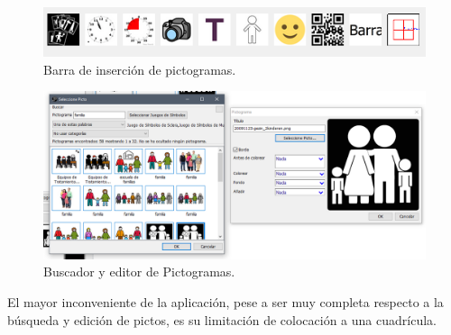 \begin{figure}[h!]
	\centering
	\includegraphics[width=0.7\linewidth]{Imagenes/Bitmap/Ribbon Pictoselector}
	\caption{Barra de inserción de pictogramas.}
	\label{fig:ribbon-pictoselector}
\end{figure}

\begin{figure}[h!]
	\centering
	\includegraphics[width=0.7\linewidth]{Imagenes/Bitmap/Editor y buscador de pictoselector}
	\caption{Buscador y editor de Pictogramas.}
	\label{fig:editor-y-buscador-de-pictoselector}
\end{figure}




El mayor inconveniente de la aplicación, pese a ser muy completa respecto a la búsqueda y edición de pictos, es su limitación de colocación a una cuadrícula.

